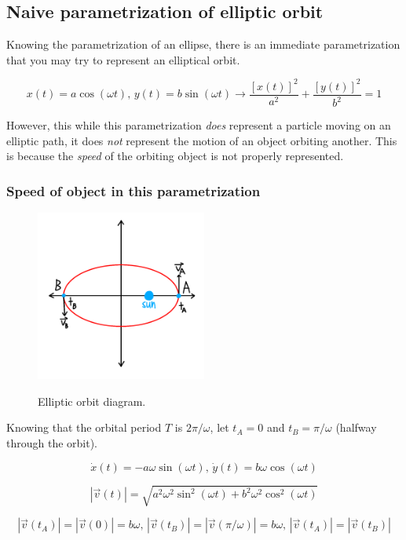 \documentclass[12pt]{article}
\begin{document}
\newpage

\subsection{Naive parametrization of elliptic orbit}

Knowing the parametrization of an ellipse, there is an immediate parametrization that you may try to represent an elliptical orbit.

\[
x(t) = a\cos(\omega t)\text{, }y(t) = b\sin(\omega t) \longrightarrow \frac{[x(t)]^2}{a^2} + \frac{[y(t)]^2}{b^2} = 1
\]

However, this while this parametrization \emph{does} represent a particle moving on an elliptic path, it does \emph{not} represent
the motion of an object orbiting another.
This is because the \emph{speed} of the orbiting object is not properly represented.

\subsubsection{Speed of object in this parametrization}

\begin{figure}[h]
    \centering
    \includegraphics[width=0.5\textwidth]{elliptic_orbit}
    \label{fig:ellipticorbit}
    \caption{Elliptic orbit diagram.}
\end{figure}

Knowing that the orbital period $T$ is $2\pi / \omega$, let $t_A = 0$ and $t_B = \pi / \omega$ (halfway through the orbit).

\[
\dot{x}(t) = -a\omega \sin(\omega t)\text{, }\dot{y}(t) = b\omega \cos(\omega t)
\]

\[
\left| \vec{v}(t) \right| = \sqrt{a^2 \omega^2 \sin^2(\omega t) + b^2 \omega^2 \cos^2(\omega t)}
\]

\[
\left| \vec{v}(t_A) \right| = \left| \vec{v}(0) \right| = b\omega \text{, } \left| \vec{v}(t_B) \right| = \left| \vec{v}(\pi / \omega) \right| = b\omega\text{, } \left| \vec{v}(t_A) \right| =\left| \vec{v}(t_B) \right| 
\]
\end{document}

